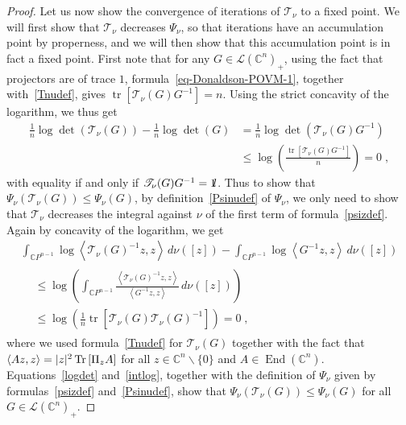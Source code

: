 \documentclass[11pt]{article}
\theoremstyle{definition}
\numberwithin{equation}{section}
\numberwithin{figure}{section}
\numberwithin{table}{section}
\DeclareMathOperator{\End}{End}
\DeclareMathOperator{\Tr}{Tr}
\DeclareMathOperator{\tr}{tr}
\let\cal\mathscr
\newcommand{\CCC}{{\mathbb{C}}}
\newcommand*\id{{1\hskip-2.5pt{\rm l}}}
\renewcommand\leq {\leqslant}
\newcommand\< {\mathcal{h}}
\renewcommand\> {\mathcal{i}}
\newcommand\TT {{\cal T}}
\newcommand*\cL{\mathscr{L}}
\begin{document}
\begin{proof}
Let us now show the convergence of iterations of $\TT_\nu$ to a fixed point. We will first show that $\TT_\nu$ decreases $\Psi_\nu$, so that iterations have an accumulation point by properness, and we will then show that this accumulation point is in fact a fixed point. First note that for any $G\in\cL(\CCC^n)_+$, using the fact that projectors are of trace $1$, formula~\eqref{eq-Donaldson-POVM-1}, together with~\eqref{Tnudef}, gives $\tr\left[\TT_\nu(G)G^{-1}\right]=n$. Using the strict concavity of the logarithm, we thus get
\begin{equation}\label{logdet}
\begin{split}
\frac{1}{n}\log\det\left(\TT_\nu(G)\right) -\frac{1}{n}\log\det\left(G\right)&=
\frac{1}{n}\log\det\left(\TT_\nu(G)G^{-1}\right)\\
&\leq\log\left(\frac{\tr\left[\TT_\nu(G)G^{-1}\right]}{n}\right) =0\;,
\end{split}
\end{equation}
with equality if and only if $\TT_\nu(G)G^{-1}=\id$. Thus to show that $\Psi_\nu(\TT_\nu(G))\leq\Psi_\nu(G)$, by definition~\eqref{Psinudef} of $\Psi_\nu$, we only need to show that $\TT_\nu$ decreases the integral against $\nu$ of the first term of formula~\eqref{psizdef}. Again by concavity of the logarithm, we get
\begin{multline}\label{intlog}
\int_{\CCC P^{n-1}}\log\left\langle \TT_\nu(G)^{-1}z,z\right\rangle\,d\nu([z])-
\int_{\CCC P^{n-1}}\log\left\langle G^{-1}z,z\right\rangle \,d\nu([z])\\
\begin{aligned}
&\leq\log\left(\int_{\CCC P^{n-1}}\frac{\left\langle\TT_\nu(G)^{-1}z,z\right\rangle} {\left\langle G^{-1}z,z\right\rangle}\,d\nu([z])
\right)\\
&\leq\log\left(\frac{1}{n}
\tr\left[\TT_\nu(G)\TT_\nu(G)^{-1}\right]\right)=0\;,
\end{aligned}
\end{multline}
where we used formula~\eqref{Tnudef} for $\TT_\nu(G)$ together with the fact that $\langle Az,z\rangle\linebreak=|z|^2\Tr\left[\Pi_zA\right]$ for all $z\in\CCC^n\backslash\{0\}$ and $A\in\End(\CCC^n)$. Equations~\eqref{logdet} and~\eqref{intlog}, together with the definition of $\Psi_\nu$ given by formulas~\eqref{psizdef} and~\eqref{Psinudef}, show that $\Psi_\nu(\TT_\nu(G))\leq\Psi_\nu(G)$ for all $G\in\cL(\CCC^n)_+$.


\end{proof}
\end{document}
